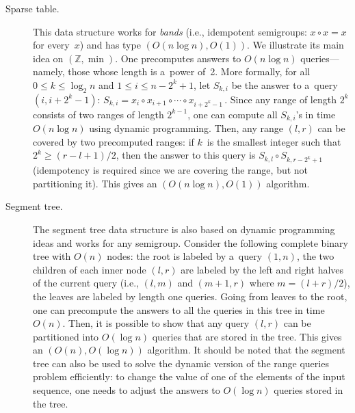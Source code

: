 \documentclass[11pt,letterpaper]{article}
\begin{document}
\begin{description}
\item[Sparse table.] This data structure works for {\em bands} (i.e., idempotent semigroups: $x \circ x = x$ for every~$x$) and has type $(O(n\log n), O(1))$. We illustrate its main idea on $(\mathbb{Z}, \min)$. One precomputes answers to $O(n\log n)$ queries---namely, those whose length is a~power of~2. More formally, for all $0 \le k \le \log_2n$ and $1 \le i \le n-2^k+1$, let $S_{k,i}$ be the answer to a~query $(i, i+2^k-1)$:
\(S_{k,i}=x_i \circ x_{i+1} \circ \dotsb \circ x_{i+2^k-1} \, .\)
Since any range of length $2^k$ consists of two ranges of length $2^{k-1}$, one can compute all $S_{k,i}$'s in time $O(n\log n)$ using dynamic programming. Then, any range $(l,r)$ can be covered by two precomputed ranges: if $k$~is the smallest integer such that $2^k \ge (r-l+1)/2$, then the answer to this query is $S_{k,l} \circ S_{k,r-2^k+1}$ (idempotency is required since we are covering the range, but not partitioning it). This gives an $(O(n\log n), O(1))$ algorithm.


\item[Segment tree.] The segment tree data structure is also based on dynamic programming ideas and works for any semigroup. Consider the following complete binary tree with $O(n)$ nodes: the root is labeled by a~query $(1,n)$, the two children of each inner node $(l,r)$ are labeled by the left and right halves of the current query (i.e., $(l,m)$ and $(m+1,r)$ where $m=(l+r)/2$), the leaves are labeled by length one queries. Going from leaves to the root, one can precompute the answers to all the queries in this tree in time $O(n)$. Then, it is possible to show that any query $(l,r)$ can be  partitioned into $O(\log n)$ queries that are stored in the tree. This gives an $(O(n), O(\log n))$ algorithm. It should be noted that the segment tree can also be used to solve the dynamic version of the range queries problem efficiently: to change the value of one of the elements of the input sequence, one needs to adjust the answers to $O(\log n)$ queries stored in the tree.


\end{description}
\end{document}

